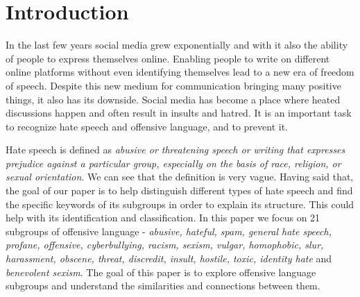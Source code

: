 \documentclass[fleqn,moreauthors,10pt]{ds_report}
\affiliation{\textit{Advisors: Assist. Prof. dr. Slavko Žitnik}}
\begin{document}
\flushbottom 

\maketitle 

\thispagestyle{empty} 


\section{Introduction}
In the last few years social media grew exponentially and with it also the ability of people to express themselves online. Enabling people to write on different online platforms without even identifying themselves lead to a new era of freedom of speech. Despite this new medium for communication bringing many positive things, it also has its downside. Social media has become a place where heated discussions happen and often result in insults and hatred. It is an important task to recognize hate speech and offensive language, and to prevent it.

Hate speech is defined as \textit{abusive or threatening speech or writing that expresses prejudice against a particular group, especially on the basis of race, religion, or sexual orientation}\cite{hate_speech}. We can see that the definition is very vague. Having said that, the goal of our paper is to help distinguish different types of hate speech and find the specific keywords of its subgroups in order to explain its structure. This could help with its identification and classification. In this paper we focus on 21 subgroups of offensive language - \textit{abusive, hateful, spam, general hate speech, profane, offensive, cyberbullying, racism, sexism, vulgar, homophobic, slur, harassment, obscene, threat, discredit, insult, hostile, toxic, identity hate} and \textit{benevolent sexism}. The goal of this paper is to explore offensive language subgroups and understand the similarities and connections between them. 
\end{document}
